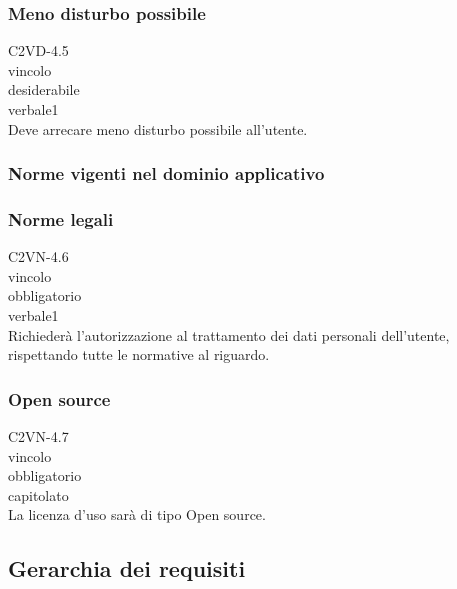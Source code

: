 \subsubsection*{Meno disturbo possibile}
 C2VD-4.5\\
 vincolo \\
 desiderabile \\
 verbale1 \\
Deve arrecare meno disturbo possibile all'utente.

\subsubsection{Norme vigenti nel dominio applicativo}
\subsubsection*{Norme legali}
 C2VN-4.6\\
 vincolo \\
 obbligatorio \\
 verbale1 \\
Richieder\`a l'autorizzazione al trattamento dei dati personali dell'utente,
rispettando tutte le normative al riguardo.

\subsubsection*{Open source}
 C2VN-4.7 \\
 vincolo \\
 obbligatorio \\
 capitolato \\
La licenza d'uso sar\`a di tipo Open source.

\subsection{Gerarchia dei requisiti}

